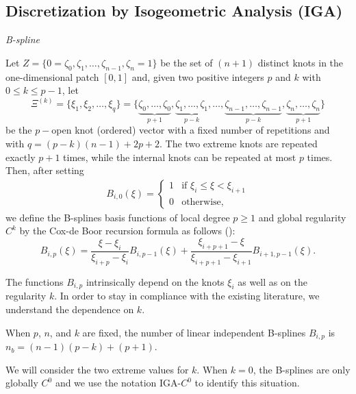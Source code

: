 \documentclass[11pt]{article}
\begin{document}
\subsection{Discretization by Isogeometric Analysis (IGA)}

\emph{B-spline}

Let $Z=\{0=\zeta_0,\zeta_1,\ldots,\zeta_{n-1},
\zeta_{n}=1\}$ be  the set of $(n+1)$ distinct knots in the one-dimensional
patch $[0,1]$ and, given two positive integers $p$ and $k$ with
$0\leq k\leq p-1$, let 
\begin{equation}
\Xi^{(k)}=\{\xi_1,\xi_2,\ldots,\xi_q\}=\{\underbrace{\zeta_0,\ldots, \zeta_0}_{p+1},
\underbrace{\zeta_1,\ldots, \zeta_1}_{p-k}, \ldots,
\underbrace{\zeta_{n-1},\ldots ,\zeta_{n-1}}_{p-k},
\underbrace{\zeta_{n},\ldots, \zeta_{n}}_{p+1} \}
\end{equation}
be the $p-$open knot (ordered) vector with a fixed number of repetitions and
with $q=(p-k)(n-1)+2p+2$.
The two extreme knots are repeated exactly $p+1$ times, 
while the internal knots
can be repeated at most $p$ times. 
Then, after setting
\begin{eqnarray}\label{N0}
B_{i,0}(\xi)=\left\{\begin{array}{ll}
1 & \mbox{if }\xi_i\leq \xi< \xi_{i+1}\\
0 &\mbox{otherwise,}
\end{array}\right.
\end{eqnarray}
 we define the B-splines basis functions of local degree $p\geq 1$ and global
regularity $C^{k}$ by the Cox-de Boor recursion formula as follows 
(\cite{chb_iga_book}):
\begin{equation}\label{bsplines}
B_{i,p}(\xi)=\frac{\xi-\xi_i}{\xi_{i+p}-\xi_i}B_{i,p-1}(\xi)
+
\frac{\xi_{i+p+1}-\xi}{\xi_{i+p+1}-\xi_{i+1}}B_{i+1,p-1}(\xi).
\end{equation}

The functions $B_{i,p}$ intrinsically depend on the knots $\xi_i$ as well as
 on the regularity $k$. 
In order to stay in compliance with the existing literature, we 
understand the dependence on $k$.

When  $p$, $n$, and $k$ are fixed, the number of linear independent
B-splines $B_{i,p}$ is $n_b=(n-1)(p-k)+(p+1)$.

We will consider the two extreme values for $k$. 
When $k=0$, the 
B-splines are only globally $C^0$ and we use the notation IGA-$C^0$ to 
identify this situation.
\end{document}

